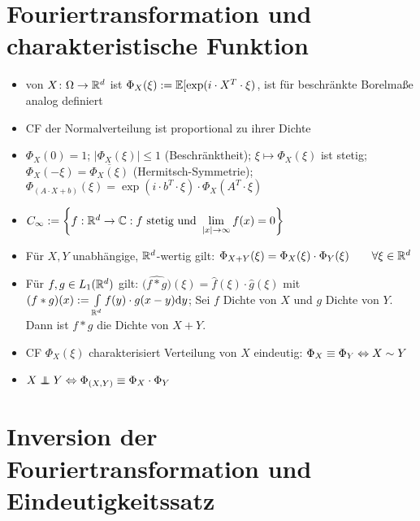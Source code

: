 \documentclass[12pt]{scrartcl}
\begin{document}
	\section{Fouriertransformation und charakteristische Funktion}
	
	\begin{itemize}
		\item {} von $X\colon\Omega\to\mathbb{R}^d$ ist $\Phi_X(\xi):=\mathbb{E}[\exp(i\cdot X^T\cdot\xi)$,  ist für beschränkte Borelmaße analog definiert
		\item CF der Normalverteilung ist proportional zu ihrer Dichte
		\item $\Phi_X(0)=1$; $|\Phi_X(\xi)|\leq1$ (Beschränktheit); $\xi\mapsto\Phi_X(\xi)$ ist stetig; $\Phi_X(-\xi)=\overline{\Phi_X(\xi)}$ (Hermitsch-Symmetrie); $\Phi_{(A\cdot X+b)}(\xi)=\exp(i\cdot b^T\cdot\xi)\cdot\Phi_X(A^T\cdot\xi)$
		\item $C_\infty:=\left\lbrace f:\mathbb{R}^d\to\mathbb{C}:f\text{ stetig und }\lim\limits_{|x|\to\infty}f(x)=0\right\rbrace$
		\item Für $X,Y$ unabhängige, $\mathbb{R}^d$-wertig gilt: $\Phi_{X+Y}(\xi)=\Phi_X(\xi)\cdot\Phi_Y(\xi)\qquad\forall\xi\in\mathbb{R}^d$
		\item Für $f,g\in L_1(\mathbb{R}^d)$ gilt: $\big(\widehat{f\ast g}\big)(\xi)=\hat{f}(\xi)\cdot\hat{g}(\xi)$
		mit $(f\ast g)(x):=\int\limits_{\mathbb{R}^d}f(y)\cdot g(x-y)\mathrm{d} y$;
		Sei $f$ Dichte von $X$ und $g$ Dichte von $Y$. Dann ist $f\ast g$ die Dichte von $X+Y$.
		\item {} CF $\Phi_X(\xi)$ charakterisiert Verteilung von $X$ eindeutig: $\Phi_X\equiv\Phi_Y\Leftrightarrow X\sim Y$
		\item {} $X\unab Y\gdw\Phi_{(X,Y)}\equiv\Phi_X\cdot\Phi_Y$
	\end{itemize}
	
	\section{Inversion der Fouriertransformation und Eindeutigkeitssatz}
	
\end{document}
